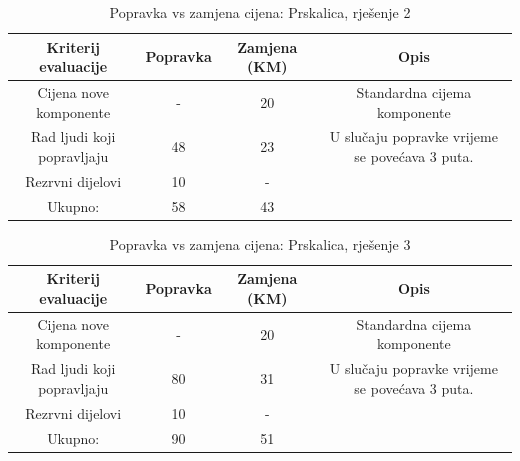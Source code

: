 \documentclass[12pt]{article}
\begin{document}
\begin{landscape}
\vspace*{\fill}
\begin{table}[htbp]
  \centering
   \footnotesize
  \caption{Popravka vs zamjena cijena: Prskalica, rješenje 2}
    \begin{tabular}{cccc}
    \toprule
    Kriterij evaluacije & Popravka & Zamjena (KM) & Opis \\
    \midrule
     Cijena nove komponente & -     & 20    & \multicolumn{1}{p{23.215em}}{Standardna \newline{}cijema\newline{} komponente} \\
    \midrule
    Rad ljudi koji popravljaju & 48    & 23    & \multicolumn{1}{p{23.215em}}{ U slučaju popravke vrijeme se povećava 3 puta. } \\
    \midrule
    Rezrvni dijelovi & 10    & -     &  \\
    \midrule
    Ukupno: & 58    & 43    &  \\
    \bottomrule
    \end{tabular}%
  \label{tab:addlabel}%
\end{table}%

\begin{table}[htbp]
  \centering
   \footnotesize
  \caption{Popravka vs zamjena cijena: Prskalica, rješenje 3}
    \begin{tabular}{cccc}
    \toprule
    Kriterij evaluacije & Popravka & Zamjena (KM) & Opis \\
    \midrule
     Cijena nove komponente & -     & 20    & \multicolumn{1}{p{24.285em}}{Standardna \newline{}cijema\newline{} komponente} \\
    \midrule
    Rad ljudi koji popravljaju & 80    & 31    & \multicolumn{1}{p{24.285em}}{ U slučaju popravke vrijeme se povećava 3 puta. } \\
    \midrule
    Rezrvni dijelovi & 10    & -     &  \\
    \midrule
    Ukupno: & 90    & 51    &  \\
    \bottomrule
    \end{tabular}%
  \label{tab:addlabel}%
\end{table}%
\vspace*{\fill}
\end{landscape}
\end{document}
